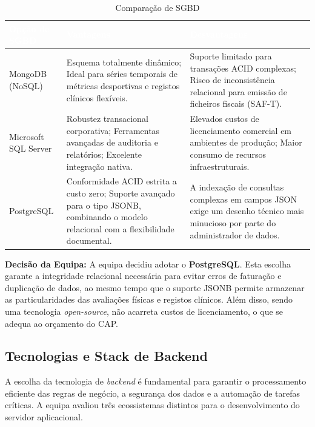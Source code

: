 \documentclass[a4paper,12pt]{scrreprt}
\begin{document}
{
\begin{table}[h]
\centering
\begin{tabular}{|p{3cm}|p{6cm}|p{6cm}|}
\hline
\rowcolor{headerblue}\textcolor{white}{\textbf{Opção de SGBD}} & \textcolor{white}{\textbf{Vantagens}} & \textcolor{white}{\textbf{Desvantagens}} \\ \hline
MongoDB (NoSQL) & Esquema totalmente dinâmico; Ideal para séries temporais de métricas desportivas e registos clínicos flexíveis. & Suporte limitado para transações ACID complexas; Risco de inconsistência relacional para emissão de ficheiros fiscais (SAF-T). \\ \hline
Microsoft SQL Server & Robustez transacional corporativa; Ferramentas avançadas de auditoria e relatórios; Excelente integração nativa. & Elevados custos de licenciamento comercial em ambientes de produção; Maior consumo de recursos infraestruturais. \\ \hline
PostgreSQL & Conformidade ACID estrita a custo zero; Suporte avançado para o tipo JSONB, combinando o modelo relacional com a flexibilidade documental. & A indexação de consultas complexas em campos JSON exige um desenho técnico mais minucioso por parte do administrador de dados. \\ \hline
\end{tabular}
\caption{Comparação de SGBD}
\end{table}

\textbf{Decisão da Equipa:} A equipa decidiu adotar o \textbf{PostgreSQL}. Esta escolha garante a integridade relacional necessária para evitar erros de faturação e duplicação de dados, ao mesmo tempo que o suporte JSONB permite armazenar as particularidades das avaliações físicas e registos clínicos. Além disso, sendo uma tecnologia \textit{open-source}, não acarreta custos de licenciamento, o que se adequa ao orçamento do CAP.



\subsection{Tecnologias e Stack de Backend}

A escolha da tecnologia de \textit{backend} é fundamental para garantir o processamento eficiente das regras de negócio, a segurança dos dados e a automação de tarefas críticas. A equipa avaliou três ecossistemas distintos para o desenvolvimento do servidor aplicacional.

}
\end{document}
